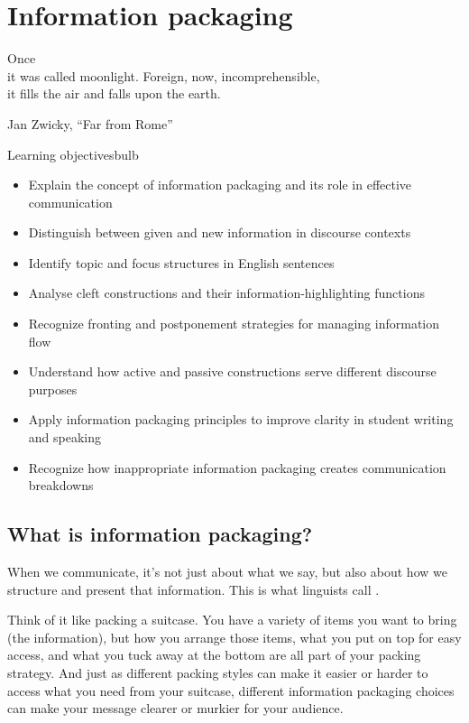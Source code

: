 \chapter{Information packaging} \label{ch:info-package}

\epigraph{Once\\
it was called moonlight. Foreign, now, incomprehensible,\\
it fills the air and falls upon the earth.}{Jan Zwicky, \enquote{Far from Rome}}

\begin{tblsframedsymbol}{Learning objectives}{bulb}
\begin{itemize}[noitemsep, leftmargin=*]
    \item Explain the concept of information packaging and its role in effective communication
    \item Distinguish between given and new information in discourse contexts
    \item Identify topic and focus structures in English sentences
    \item Analyse cleft constructions and their information-highlighting functions
    \item Recognize fronting and postponement strategies for managing information flow
    \item Understand how active and passive constructions serve different discourse purposes
    \item Apply information packaging principles to improve clarity in student writing and speaking
    \item Recognize how inappropriate information packaging creates communication breakdowns
\end{itemize}
\end{tblsframedsymbol}


\section{What is information packaging?}

When we communicate, it's not just about what we say, but also about how we structure and present that information. This is what linguists call .

Think of it like packing a suitcase. You have a variety of items you want to bring (the information), but how you arrange those items, what you put on top for easy access, and what you tuck away at the bottom are all part of your packing strategy. And just as different packing styles can make it easier or harder to access what you need from your suitcase, different information packaging choices can make your message clearer or murkier for your audience.

